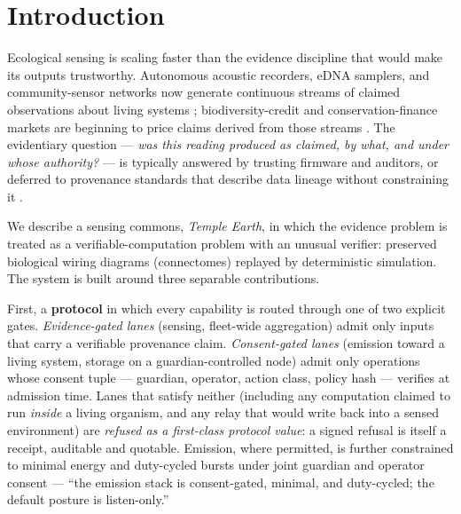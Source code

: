 \documentclass[pdflatex,sn-basic]{sn-jnl}
\begin{document}

\maketitle

\section{Introduction}\label{sec:intro}
Ecological sensing is scaling faster than the evidence discipline that
would make its outputs trustworthy. Autonomous acoustic recorders,
eDNA samplers, and community-sensor networks now generate continuous
streams of claimed observations about living systems
\cite{hill2018,sueur2015,kahl2021}; biodiversity-credit and
conservation-finance markets are beginning to price claims derived
from those streams \cite{ford2024}. The evidentiary question ---
\emph{was this reading produced as claimed, by what, and under whose
authority?} --- is typically answered by trusting firmware and
auditors, or deferred to provenance standards that describe data
lineage without constraining it \cite{provo2013,wieczorek2012}.

We describe a sensing commons, \emph{Temple Earth}, in which the
evidence problem is treated as a verifiable-computation problem with
an unusual verifier: preserved biological wiring diagrams
(connectomes) replayed by deterministic simulation. The system is
built around three separable contributions.

First, a \textbf{protocol} in which every capability is routed through
one of two explicit gates. \emph{Evidence-gated lanes} (sensing,
fleet-wide aggregation) admit only inputs that carry a verifiable
provenance claim. \emph{Consent-gated lanes} (emission toward a living
system, storage on a guardian-controlled node) admit only operations
whose consent tuple --- guardian, operator, action class, policy
hash --- verifies at admission time. Lanes that satisfy neither
(including any computation claimed to run \emph{inside} a living
organism, and any relay that would write back into a sensed
environment) are \emph{refused as a first-class protocol value}: a
signed refusal is itself a receipt, auditable and quotable. Emission,
where permitted, is further constrained to minimal energy and
duty-cycled bursts under joint guardian and operator consent ---
``the emission stack is consent-gated, minimal, and duty-cycled; the
default posture is listen-only.''
\end{document}
